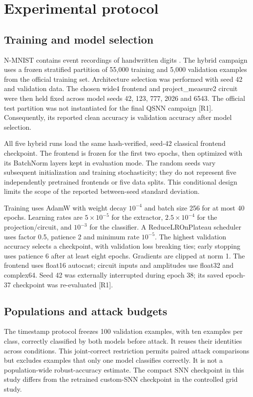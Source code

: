 \section{Experimental protocol}\label{sec:protocol}
\subsection{Training and model selection}
N-MNIST contains event recordings of handwritten digits \cite{orchard2015}. The hybrid campaign uses a frozen stratified partition of 55,000 training and 5,000 validation examples from the official training set. Architecture selection was performed with seed 42 and validation data. The chosen wide4 frontend and project\_measure2 circuit were then held fixed across model seeds 42, 123, 777, 2026 and 6543. The official test partition was not instantiated for the final QSNN campaign [R1]. Consequently, its reported clean accuracy is validation accuracy after model selection.

All five hybrid runs load the same hash-verified, seed-42 classical frontend checkpoint. The frontend is frozen for the first two epochs, then optimized with its BatchNorm layers kept in evaluation mode. The random seeds vary subsequent initialization and training stochasticity; they do not represent five independently pretrained frontends or five data splits. This conditional design limits the scope of the reported between-seed standard deviation.


Training uses AdamW with weight decay $10^{-4}$ and batch size 256 for at most 40 epochs. Learning rates are $5\times10^{-5}$ for the extractor, $2.5\times10^{-4}$ for the projection/circuit, and $10^{-3}$ for the classifier. A ReduceLROnPlateau scheduler uses factor 0.5, patience 2 and minimum rate $10^{-5}$. The highest validation accuracy selects a checkpoint, with validation loss breaking ties; early stopping uses patience 6 after at least eight epochs. Gradients are clipped at norm 1. The frontend uses float16 autocast; circuit inputs and amplitudes use float32 and complex64. Seed 42 was externally interrupted during epoch 38; its saved epoch-37 checkpoint was re-evaluated [R1].

\subsection{Populations and attack budgets}
The timestamp protocol freezes 100 validation examples, with ten examples per class, correctly classified by both models before attack. It reuses their identities across conditions. This joint-correct restriction permits paired attack comparisons but excludes examples that only one model classifies correctly. It is not a population-wide robust-accuracy estimate. The compact SNN checkpoint in this study differs from the retrained custom-SNN checkpoint in the controlled grid study.

